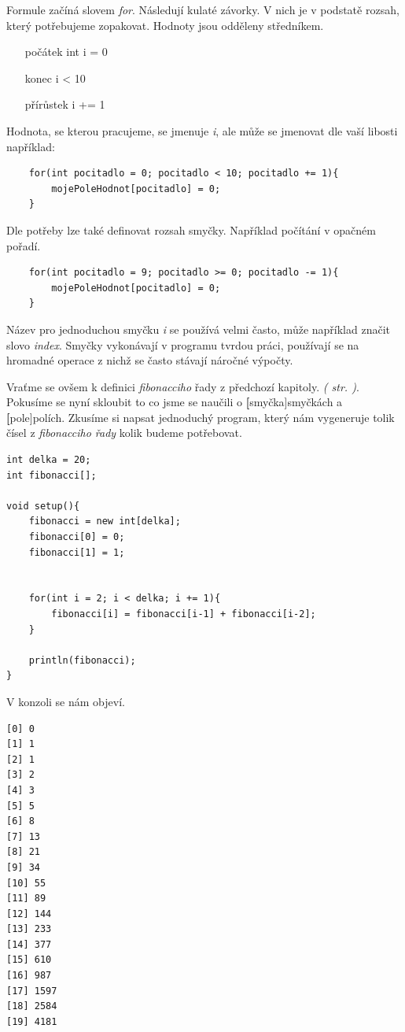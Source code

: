 \documentclass[10pt]{book}
\newcommand{\slovnik}[1]{\textbf{\gls{#1}}\index{#1}\label{#1}}
\newcommand{\vyraz}[1]{\textit{\gls{#1}}\index{#1}\label{#1}}
\newcommand{\odkaz}[1]{\textit{(\nameref{#1} str. \pageref*{#1})}}
\begin{document}
Formule začíná slovem \vyraz{for}. Následují kulaté závorky. V nich je v podstatě rozsah, který potřebujeme zopakovat. Hodnoty jsou odděleny středníkem.

\begin{itemize}
\item[počátek] int i = 0
\item[konec] i < 10
\item[přírůstek] i += 1
\end{itemize}

Hodnota, se kterou pracujeme, se jmenuje {\em i}, ale může se jmenovat dle vaší libosti například:

\begin{lstlisting}
	for(int pocitadlo = 0; pocitadlo < 10; pocitadlo += 1){
		mojePoleHodnot[pocitadlo] = 0;
	}
\end{lstlisting}

Dle potřeby lze také definovat rozsah smyčky. Například počítání v opačném pořadí.


\begin{lstlisting}
	for(int pocitadlo = 9; pocitadlo >= 0; pocitadlo -= 1){
		mojePoleHodnot[pocitadlo] = 0;
	}
\end{lstlisting}

Název pro jednoduchou smyčku {\em i} se používá velmi často, může například značit slovo {\em index}. Smyčky vykonávají v programu tvrdou práci, používají se na hromadné operace z nichž se často stávají náročné výpočty.

Vraťme se ovšem k definici {\em fibonacciho} řady z předchozí kapitoly. \odkaz{Pole}. Pokusíme se nyní skloubit to co jsme se naučili o \slovnik[smyčka]{smyčkách} a \slovnik[pole]{polích}. Zkusíme si napsat jednoduchý program, který nám vygeneruje tolik čísel z {\em fibonacciho řady} kolik budeme potřebovat.


\begin{lstlisting}
int delka = 20;
int fibonacci[];

void setup(){
	fibonacci = new int[delka];
	fibonacci[0] = 0;
	fibonacci[1] = 1;
	
	
	for(int i = 2; i < delka; i += 1){
		fibonacci[i] = fibonacci[i-1] + fibonacci[i-2];
	}
	
	println(fibonacci);
}

\end{lstlisting}

V konzoli se nám objeví.

\begin{lstlisting}
[0] 0
[1] 1
[2] 1
[3] 2
[4] 3
[5] 5
[6] 8
[7] 13
[8] 21
[9] 34
[10] 55
[11] 89
[12] 144
[13] 233
[14] 377
[15] 610
[16] 987
[17] 1597
[18] 2584
[19] 4181
\end{lstlisting}
\end{document}
